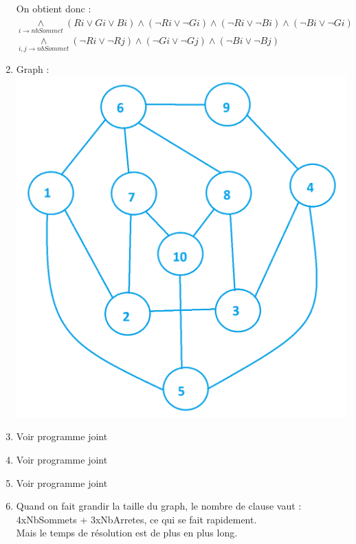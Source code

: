 \documentclass[12pt]{report}
\begin{document}
\begin{enumerate}
\noindent On obtient donc : \\
$\underset{i \rightarrow nbSommet}{\land} (Ri \lor Gi \lor Bi) \land (\lnot Ri \lor \lnot Gi) \land (\lnot Ri \lor \lnot Bi) \land (\lnot Bi \lor \lnot Gi)$ \\
$\underset{i,j \rightarrow nbSommet}{\land} (\lnot Ri \lor \lnot Rj) \land (\lnot Gi \lor \lnot Gj) \land (\lnot Bi \lor \lnot Bj) $
\item Graph :\\
\includegraphics[scale=0.5]{./graph.png}\\[1cm]
\item Voir programme joint
\item Voir programme joint
\item Voir programme joint
\item Quand on fait grandir la taille du graph, le nombre de clause vaut : \\4xNbSommets + 3xNbArretes, ce qui se fait rapidement. \\
Mais le temps de résolution est de plus en plus long.
\end{enumerate}
\end{document}
